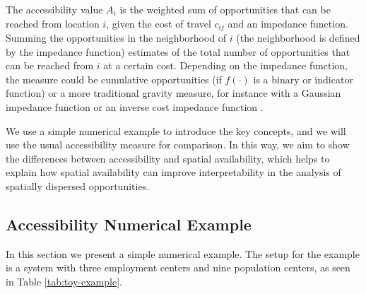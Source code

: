 \documentclass[]{elsarticle} %
\begin{document}
The accessibility value \(A_i\) is the weighted sum of opportunities
that can be reached from location \(i\), given the cost of travel
\(c_{ij}\) and an impedance function. Summing the opportunities in the
neighborhood of \(i\) (the neighborhood is defined by the impedance
function) estimates of the total number of opportunities that can be
reached from \(i\) at a certain cost. Depending on the impedance
function, the measure could be cumulative opportunities (if \(f(\cdot)\)
is a binary or indicator function) or a more traditional gravity
measure, for instance with a Gaussian impedance function or an inverse
cost impedance function .

We use a simple numerical example to introduce the key concepts, and we
will use the usual accessibility measure for comparison. In this way, we
aim to show the differences between accessibility and spatial
availability, which helps to explain how spatial availability can
improve interpretability in the analysis of spatially dispersed
opportunities.

\hypertarget{accessibility-numerical-example}{%
\subsection{Accessibility Numerical
Example}\label{accessibility-numerical-example}}

In this section we present a simple numerical example. The setup for the
example is a system with three employment centers and nine population
centers, as seen in Table \ref{tab:toy-example}.
\end{document}
